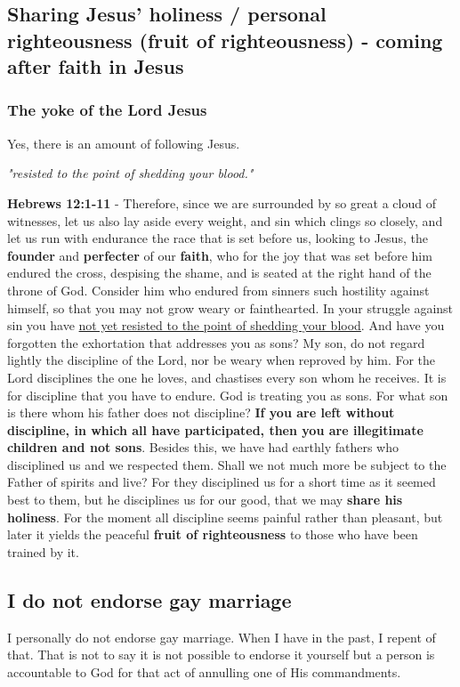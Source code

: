 \documentclass[11pt]{article}
\begin{document}
\subsection{Sharing Jesus' holiness / personal righteousness (fruit of righteousness) - coming \textbf{after} faith in Jesus}
\label{sec:orgd33d512}
\subsubsection{The yoke of the Lord Jesus}
\label{sec:orgb9c0af8}
Yes, there is an amount of following Jesus.

\emph{"resisted to the point of shedding your blood."}

\textbf{Hebrews 12:1-11} - Therefore, since we are surrounded by so great a cloud of witnesses, let us also lay aside every weight, and sin which clings so closely, and let us run with endurance the race that is set before us, looking to Jesus, the \textbf{founder} and \textbf{perfecter} of our \textbf{faith}, who for the joy that was set before him endured the cross, despising the shame, and is seated at the right hand of the throne of God.  Consider him who endured from sinners such hostility against himself, so that you may not grow weary or fainthearted.  In your struggle against sin you have \uline{not yet resisted to the point of shedding your blood}.  And have you forgotten the exhortation that addresses you as sons? My son, do not regard lightly the discipline of the Lord, nor be weary when reproved by him.  For the Lord disciplines the one he loves, and chastises every son whom he receives.  It is for discipline that you have to endure. God is treating you as sons. For what son is there whom his father does not discipline?  \textbf{If you are left without discipline, in which all have participated, then you are illegitimate children and not sons}.  Besides this, we have had earthly fathers who disciplined us and we respected them. Shall we not much more be subject to the Father of spirits and live?  For they disciplined us for a short time as it seemed best to them, but he disciplines us for our good, that we may \textbf{share his holiness}.  For the moment all discipline seems painful rather than pleasant, but later it yields the peaceful \textbf{fruit of righteousness} to those who have been trained by it.

\subsection{I do not endorse gay marriage}
\label{sec:orgb3c6771}
I personally do not endorse gay marriage. When I have in the past, I repent of that. That is not to say it is not possible to endorse it yourself but a person is accountable to God for that act of annulling one of His commandments.
\end{document}
